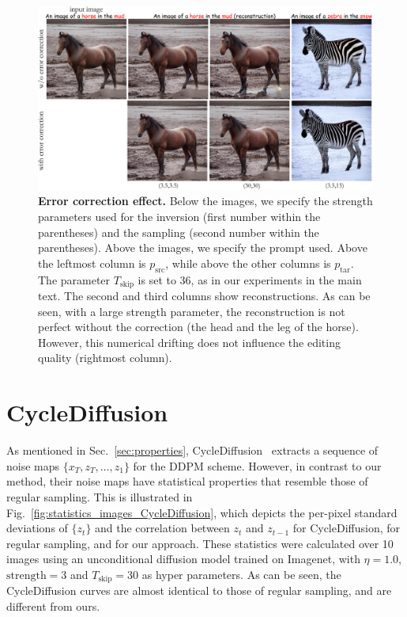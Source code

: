 \begin{figure}[H]
\centering
\includegraphics[width=\columnwidth]{ICCV23_submission/figures/reconstruction_for_rebuttal.pdf}
\caption{\textbf{Error correction effect.} 
Below the images, we specify the strength parameters used for the inversion (first number within the parentheses) and the sampling (second number within the parentheses). Above the images, we specify the prompt used. Above the leftmost column is $p_{\text{src}}$, while above the other columns is $p_{\text{tar}}$. The parameter $T_{\text{skip}}$ is set to 36, as in our experiments in the main text. The second and third columns show reconstructions. As can be seen, with a large strength parameter, the reconstruction is not perfect without the correction (\eg the head and the leg of the horse). However, this numerical drifting does not influence the editing quality (rightmost column).}

\label{fig:reconstruction_for_rebuttal}
\end{figure}




\clearpage

\section{CycleDiffusion}
As mentioned in Sec.~\ref{sec:properties}, CycleDiffusion~\cite{Wu22} extracts a sequence of noise maps $\{x_T,z_T,\ldots,z_1\}$ for the DDPM scheme. However, in contrast to our method, their noise maps have statistical properties that resemble those of regular sampling. %
This is illustrated in Fig.~\ref{fig:statistics_images_CycleDiffusion}, which depicts the per-pixel standard deviations of $\{z_t\}$ and the correlation between $z_t$ and $z_{t-1}$ for CycleDiffusion, for regular sampling, and for our approach. These statistics were calculated over 10 images using an unconditional diffusion model trained on Imagenet, with $\eta=1.0$, $\text{strength}=3$ and $T_{\text{skip}} = 30$ as hyper parameters.
As can be seen, the CycleDiffusion curves are almost identical to those of regular sampling, and are different from ours. 

